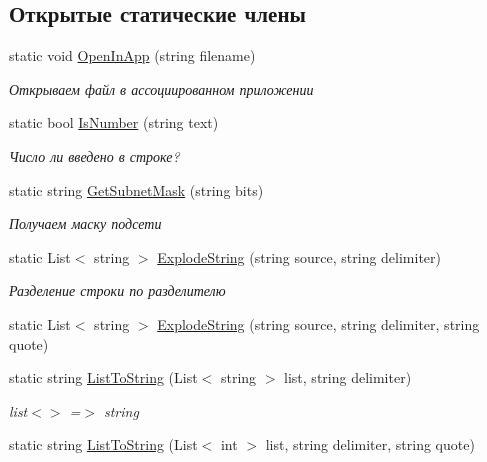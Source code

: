 \subsection*{Открытые статические члены}
\begin{DoxyCompactItemize}
\item 
static void \hyperlink{class_common_facilities_1_1_common_af235757770ae7e5193e1da63f5cf7099}{Open\+In\+App} (string filename)
\begin{DoxyCompactList}\small\item\em Открываем файл в ассоциированном приложении \end{DoxyCompactList}\item 
static bool \hyperlink{class_common_facilities_1_1_common_acc685d82e65aa2bc23a7c8b29c4032d6}{Is\+Number} (string text)
\begin{DoxyCompactList}\small\item\em Число ли введено в строке? \end{DoxyCompactList}\item 
static string \hyperlink{class_common_facilities_1_1_common_aadd8440e0701038354a3e1855c8b7654}{Get\+Subnet\+Mask} (string bits)
\begin{DoxyCompactList}\small\item\em Получаем маску подсети \end{DoxyCompactList}\item 
static List$<$ string $>$ \hyperlink{class_common_facilities_1_1_common_a8b10297528cafddba8fa28c0a207becc}{Explode\+String} (string source, string delimiter)
\begin{DoxyCompactList}\small\item\em Разделение строки по разделителю \end{DoxyCompactList}\item 
static List$<$ string $>$ \hyperlink{class_common_facilities_1_1_common_a7a3e176f59c91495a57ff1ab7ebb7daa}{Explode\+String} (string source, string delimiter, string quote)
\item 
static string \hyperlink{class_common_facilities_1_1_common_ad1cf9de3bb6a413a6021af56348c61cb}{List\+To\+String} (List$<$ string $>$ list, string delimiter)
\begin{DoxyCompactList}\small\item\em list$<$$>$ =$>$ string \end{DoxyCompactList}\item 
static string \hyperlink{class_common_facilities_1_1_common_a9f89c41b399979a948f1fd9514d9876c}{List\+To\+String} (List$<$ int $>$ list, string delimiter, string quote)

\end{DoxyCompactItemize}
